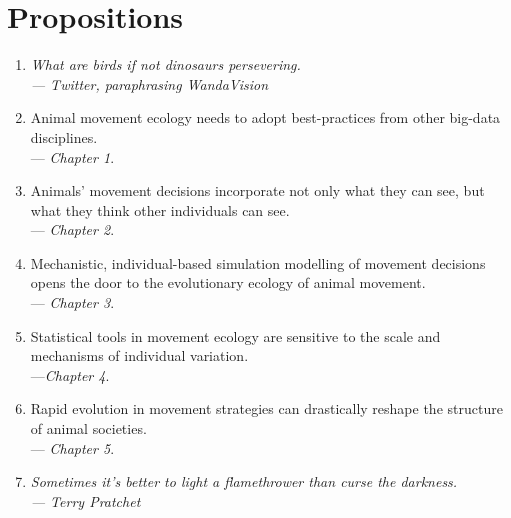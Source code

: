 \begingroup

\chapter*{Propositions}

\begin{onehalfspace}
    
    \begin{enumerate}
        \item \textit{What are birds if not dinosaurs persevering.\\--- Twitter, paraphrasing WandaVision}
        \item Animal movement ecology needs to adopt best-practices from other big-data disciplines.\\ --- \textit{Chapter 1}.
        \item Animals' movement decisions incorporate not only what they can see, but what they think other individuals can see.\\ --- \textit{Chapter 2}.
        \item Mechanistic, individual-based simulation modelling of movement decisions opens the door to the evolutionary ecology of animal movement. \\ --- \textit{Chapter 3}.
        \item Statistical tools in movement ecology are sensitive to the scale and mechanisms of individual variation.\\ ---\textit{Chapter 4}.
        \item Rapid evolution in movement strategies can drastically reshape the structure of animal societies.\\ --- \textit{Chapter 5}.
        \item \textit{Sometimes it's better to light a flamethrower than curse the darkness.\\--- Terry Pratchet}
    \end{enumerate}

\end{onehalfspace}

\endgroup

\vfill

\clearpage
